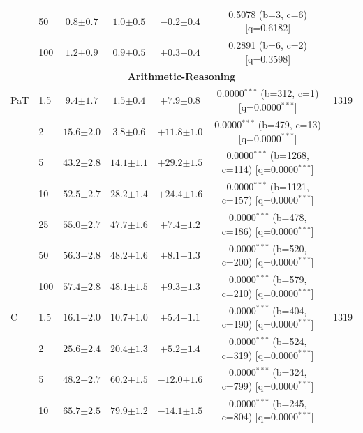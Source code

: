 \begin{table}[h!]
\begin{tabular}{l l cccc c}
 & 50 & $0.8 {\scriptstyle \pm 0.7}$ & $1.0 {\scriptstyle \pm 0.5}$ & $-0.2 {\scriptstyle \pm 0.4}$ & 0.5078 (b=3, c=6) [q=0.6182] &  \\
 & 100 & $1.2 {\scriptstyle \pm 0.9}$ & $0.9 {\scriptstyle \pm 0.5}$ & $+0.3 {\scriptstyle \pm 0.4}$ & 0.2891 (b=6, c=2) [q=0.3598] &  \\
\midrule
\multicolumn{7}{c}{\textbf{Arithmetic-Reasoning}} \\
\midrule
PaT & 1.5 & $9.4 {\scriptstyle \pm 1.7}$ & $1.5 {\scriptstyle \pm 0.4}$ & $+7.9 {\scriptstyle \pm 0.8}$ & 0.0000$^{***}$ (b=312, c=1) [q=0.0000$^{***}$] & 1319 \\
 & 2 & $15.6 {\scriptstyle \pm 2.0}$ & $3.8 {\scriptstyle \pm 0.6}$ & $+11.8 {\scriptstyle \pm 1.0}$ & 0.0000$^{***}$ (b=479, c=13) [q=0.0000$^{***}$] &  \\
 & 5 & $43.2 {\scriptstyle \pm 2.8}$ & $14.1 {\scriptstyle \pm 1.1}$ & $+29.2 {\scriptstyle \pm 1.5}$ & 0.0000$^{***}$ (b=1268, c=114) [q=0.0000$^{***}$] &  \\
 & 10 & $52.5 {\scriptstyle \pm 2.7}$ & $28.2 {\scriptstyle \pm 1.4}$ & $+24.4 {\scriptstyle \pm 1.6}$ & 0.0000$^{***}$ (b=1121, c=157) [q=0.0000$^{***}$] &  \\
 & 25 & $55.0 {\scriptstyle \pm 2.7}$ & $47.7 {\scriptstyle \pm 1.6}$ & $+7.4 {\scriptstyle \pm 1.2}$ & 0.0000$^{***}$ (b=478, c=186) [q=0.0000$^{***}$] &  \\
 & 50 & $56.3 {\scriptstyle \pm 2.8}$ & $48.2 {\scriptstyle \pm 1.6}$ & $+8.1 {\scriptstyle \pm 1.3}$ & 0.0000$^{***}$ (b=520, c=200) [q=0.0000$^{***}$] &  \\
 & 100 & $57.4 {\scriptstyle \pm 2.8}$ & $48.1 {\scriptstyle \pm 1.5}$ & $+9.3 {\scriptstyle \pm 1.3}$ & 0.0000$^{***}$ (b=579, c=210) [q=0.0000$^{***}$] &  \\
\midrule
C & 1.5 & $16.1 {\scriptstyle \pm 2.0}$ & $10.7 {\scriptstyle \pm 1.0}$ & $+5.4 {\scriptstyle \pm 1.1}$ & 0.0000$^{***}$ (b=404, c=190) [q=0.0000$^{***}$] & 1319 \\
 & 2 & $25.6 {\scriptstyle \pm 2.4}$ & $20.4 {\scriptstyle \pm 1.3}$ & $+5.2 {\scriptstyle \pm 1.4}$ & 0.0000$^{***}$ (b=524, c=319) [q=0.0000$^{***}$] &  \\
 & 5 & $48.2 {\scriptstyle \pm 2.7}$ & $60.2 {\scriptstyle \pm 1.5}$ & $-12.0 {\scriptstyle \pm 1.6}$ & 0.0000$^{***}$ (b=324, c=799) [q=0.0000$^{***}$] &  \\
 & 10 & $65.7 {\scriptstyle \pm 2.5}$ & $79.9 {\scriptstyle \pm 1.2}$ & $-14.1 {\scriptstyle \pm 1.5}$ & 0.0000$^{***}$ (b=245, c=804) [q=0.0000$^{***}$] &  \\

\end{tabular}
\end{table}
